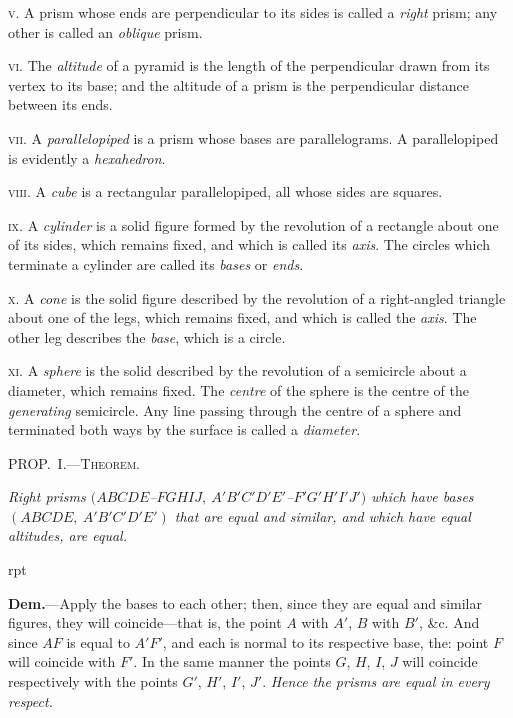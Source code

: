 \documentclass[oneside]{book}
\newcommand\mypropl[2]{
\bigskip\Needspace*{4\baselineskip}\begin{center}\textsc{#1}\end{center}
\hspace{\parindent}\emph{#2}\par\medskip
}
\newcommand\imgflow[3]{
\setcounter{wrapwidth}{#1}
\begin{wrapfigure}[#2]{r}{\value{wrapwidth}pt}
\begin{center}
\vspace{-0.3in}
\end{center}
\end{wrapfigure}
}
\begin{document}
\textsc{v.} A prism whose ends are perpendicular to its sides
is called a \textit{right} prism; any other is called an \textit{oblique}
prism.

\textsc{vi.} The \textit{altitude} of a pyramid is the length of the
perpendicular drawn from its vertex to its base; and
the altitude of a prism is the perpendicular distance
between its ends.

\textsc{vii.} A \textit{parallelopiped} is a prism whose bases are
parallelograms. A parallelopiped is evidently a \textit{hexahedron}.


\textsc{viii.} A \textit{cube} is a rectangular parallelopiped, all whose
sides are squares.

\textsc{ix.} A \textit{cylinder} is a solid figure formed by the revolution
of a rectangle about one of its sides, which remains
fixed, and which is called its \textit{axis}. The circles which
terminate a cylinder are called its \textit{bases} or \textit{ends}.

\textsc{x.} A \textit{cone} is the solid figure described by the revolution
of a right-angled triangle about one of the legs,
which remains fixed, and which is called the \textit{axis}. The
other leg describes the \textit{base}, which is a circle.

\textsc{xi.} A \textit{sphere} is the solid described by the revolution
of a semicircle about a diameter, which remains fixed.
The \textit{centre} of the sphere is the centre of the \textit{generating}
semicircle. Any line passing through the centre of
a sphere and terminated both ways by the surface is
called a \textit{diameter}.

\mypropl{PROP\@.~I.---Theorem.}{Right prisms $(ABCDE$--$FGHIJ,\ A'B'C'D'E'$--$F'G'H'I'J')$ which
have ba\-ses $(ABCDE,\ A'B'C'D'E')$ that are equal and similar,
and which have equal altitudes, are equal.}

\imgflow{175}{12}{f236}

\textbf{Dem.}---Apply the bases to each other; then, since
they are equal and
similar figures, they
will coincide---that
is, the point $A$ with
$A'$, $B$ with $B'$, \&c.
And since $AF$ is
equal to $A'F'$, and
each is normal to
its respective base,
the: point $F$ will
coincide with $F'$. In
the same manner the
points $G$, $H$, $I$, $J$ will coincide respectively with the
points $G'$, $H'$, $I'$, $J'$. \textit{Hence the prisms are equal in every
respect.}
\end{document}
